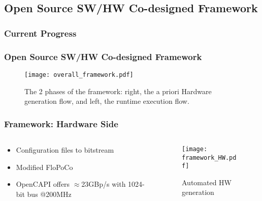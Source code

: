 \subsection{Open Source SW/HW Co-designed Framework}
\begin{frame}
    \frametitle{Current Progress}

    \tableofcontents[currentsection,
                     subsectionstyle=show/shaded/hide,
                     sectionstyle=show/hide]

\end{frame}

\begin{frame}
    \frametitle{Open Source SW/HW Co-designed Framework}
    \begin{figure}
      \centering
      \texttt{[image: overall\_framework.pdf]}
      \caption{The 2 phases of the framework: right, the a priori Hardware generation flow, and left, the runtime execution flow.}
    \end{figure}

\end{frame}


\begin{frame}
    \frametitle{Framework: Hardware Side}

    \begin{columns}

    \begin{column}{0.5\textwidth} %
        \begin{itemize} %
	    \item<1-> Configuration files to bitstream
	    \item<1-> Modified FloPoCo~\cite{flopoco1}
            \item<1-> OpenCAPI offers $\approx$23GBp/s with 1024-bit bus @200MHz
        \end{itemize}
    \end{column}

    \begin{column}{0.5\textwidth}
        \begin{figure}
            \centering
            \texttt{[image: framework\_HW.pdf]}
            \caption{Automated HW generation}
        \end{figure}
    \end{column}

    \end{columns}


\end{frame}

